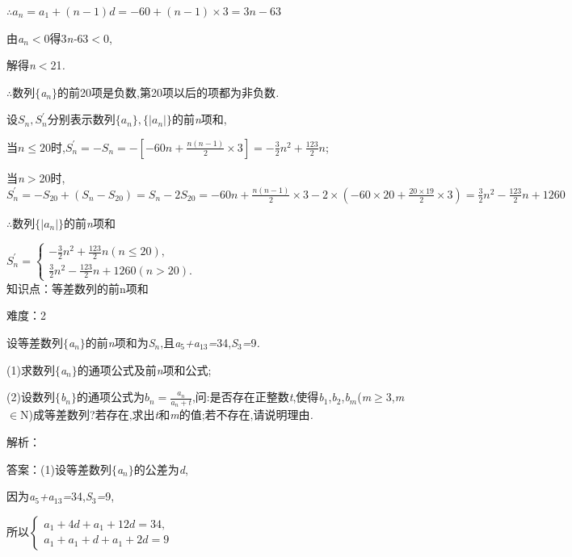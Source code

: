 \documentclass{article} %
\begin{document}
$\therefore a_n=a_1+(n-1)d=-60+(n-1)\times 3=3n-63$

由\textit{a${}_{n}$$<$}0得3\textit{n-}63\textit{$<$}0,

解得\textit{n$<$}21\textit{.}

\textit{$\therefore$}数列$\mathrm{\{}$\textit{a${}_{n}$}$\mathrm{\}}$的前20项是负数,第20项以后的项都为非负数\textit{.}

设$S_n,S_n^{'}$分别表示数列$\{a_n\},\{|a_n|\}$的前\textit{n}项和,

当$n\le 20$时,$S_n^{'}=-S_n=-[-60n+\frac{n(n-1)}{2}\times 3]=-\frac{3}{2}n^2+\frac{123}{2}n$;

当\textit{n$>$}20时,$S_n^{'}=-S_{20}+(S_n-S_{20})=S_n-2S_{20}=-60n+\frac{n(n-1)}{2}\times 3-2\times (-60\times 20+\frac{20\times 19}{2}\times 3)=\frac{3}{2}n^2-\frac{123}{2}n+1260$

$\therefore$数列$\{|a_n|\}$的前\textit{n}项和

$S_n^{'}=\left\{
\begin{array}{l}
-\frac{3}{2}n^2+\frac{123}{2}n(n\le 20), \\
\frac{3}{2}n^2-\frac{123}{2}n+1260(n>20).
\end{array}
\right.$ \\

知识点：等差数列的前n项和

难度：2

 设等差数列$\mathrm{\{}$\textit{a${}_{n}$}$\mathrm{\}}$的前\textit{n}项和为\textit{S${}_{n}$},且\textit{a}${}_{5}$\textit{+a}${}_{13}$\textit{=}34,\textit{S}${}_{3}$\textit{=}9\textit{.}

 (1)求数列$\mathrm{\{}$\textit{a${}_{n}$}$\mathrm{\}}$的通项公式及前\textit{n}项和公式;

 (2)设数列$\mathrm{\{}$\textit{b${}_{n}$}$\mathrm{\}}$的通项公式为$b_n=\frac{a_n}{a_n+t}$,问:是否存在正整数\textit{t},使得\textit{b}${}_{1}$,\textit{b}${}_{2}$,\textit{b${}_{m}$}(\textit{m}$\mathrm{\ge}$3,\textit{m}$\mathrm{\in}$N)成等差数列?若存在,求出\textit{t}和\textit{m}的值;若不存在,请说明理由\textit{.}

解析：

 答案：(1)设等差数列$\mathrm{\{}$\textit{a${}_{n}$}$\mathrm{\}}$的公差为\textit{d},

因为\textit{a}${}_{5}$\textit{+a}${}_{13}$\textit{=}34,\textit{S}${}_{3}$\textit{=}9,

所以$\left\{
\begin{array}{l}
a_1+4d+a_1+12d=34, \\
a_1+a_1+d+a_1+2d=9
\end{array}
\right.$
\end{document}
